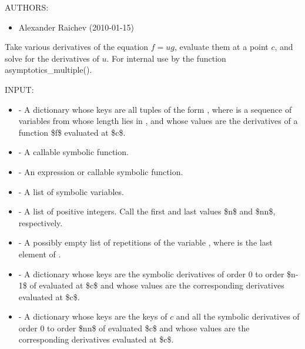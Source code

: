 \documentclass[letterpaper,12pt,openany,oneside]{sphinxmanual}
\begin{document}
\begin{fulllineitems}
\begin{fulllineitems}
AUTHORS:
\begin{itemize}
\item {} 
Alexander Raichev (2010-01-15)

\end{itemize}

\end{fulllineitems}


\begin{fulllineitems}
\label{amgf:amgf.FFPD.diff_prod}
Take various derivatives of the equation $f = ug$,
evaluate them at a point $c$, and solve for the derivatives of $u$.
For internal use by the function asymptotics\_multiple().

INPUT:
\begin{itemize}
\item {} 
 - A dictionary whose keys are all tuples of the form
, where  is a sequence of variables from  whose
length lies in , and whose values are the derivatives
of a function \$f\$ evaluated at \$c\$.

\item {} 
 - A callable symbolic function.

\item {} 
 - An expression or callable symbolic function.

\item {} 
 - A list of symbolic variables.

\item {} 
 - A list of positive integers.
Call the first and last values \$n\$ and \$nn\$, respectively.

\item {} 
 - A possibly empty list of repetitions of the
variable , where  is the last element of .

\item {} 
 - A dictionary whose keys are the symbolic
derivatives of order 0 to order \$n-1\$ of  evaluated at \$c\$
and whose values are the corresponding derivatives evaluated
at \$c\$.

\item {} 
 - A dictionary whose keys are the keys of $c$ and all
the symbolic derivatives of order 0 to order \$nn\$ of 
evaluated \$c\$ and whose values are the corresponding
derivatives evaluated at \$c\$.


\end{itemize}
\end{fulllineitems}
\end{fulllineitems}
\end{document}
